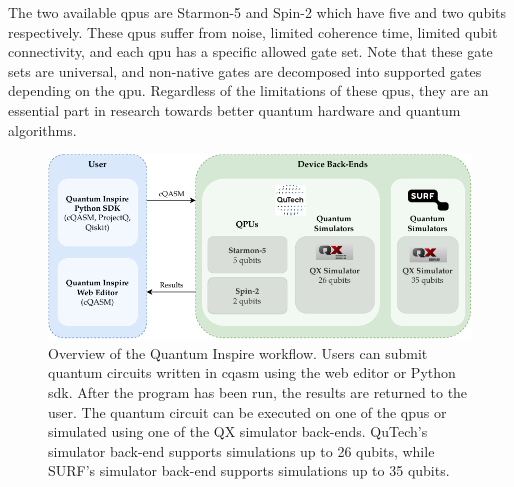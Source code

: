 The two available \glspl{qpu} are Starmon-5 and Spin-2 which have five and two qubits respectively.
These \glspl{qpu} suffer from noise, limited coherence time, limited qubit connectivity, and each \gls{qpu} has a specific allowed gate set.
Note that these gate sets are universal, and non-native gates are decomposed into supported gates depending on the \gls{qpu}.
Regardless of the limitations of these \glspl{qpu}, they are an essential part in research towards better quantum hardware and quantum algorithms.
\begin{figure}[ht]
    \centering
    \includegraphics[width=1\linewidth]{figures/qi-workflow.pdf}
    \caption[Overview of the Quantum Inspire workflow.]{
        Overview of the Quantum Inspire workflow.
        Users can submit quantum circuits written in \gls{cqasm} using the web editor or Python \gls{sdk}.
        After the program has been run, the results are returned to the user.
        The quantum circuit can be executed on one of the \glspl{qpu} or simulated using one of the QX simulator back-ends.
        QuTech's simulator back-end supports simulations up to 26 qubits, while SURF's simulator back-end supports simulations up to 35 qubits.
    }
    \label{fig:qi-workflow}
\end{figure}

